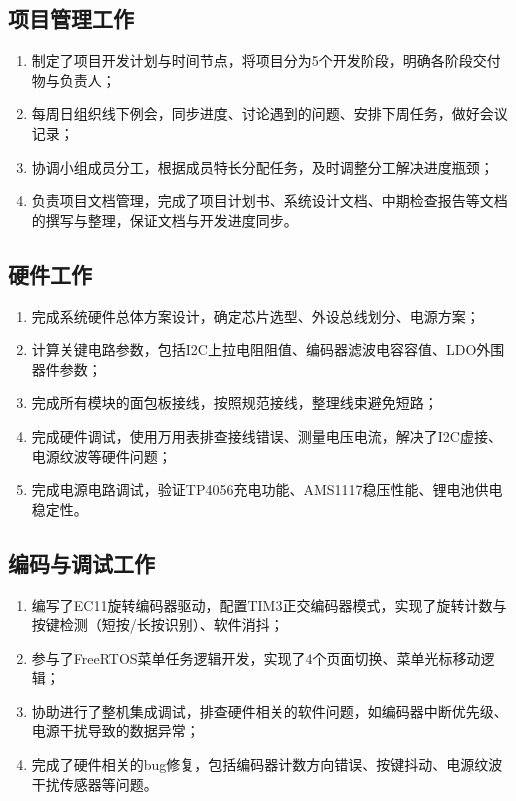 \documentclass[12pt, a4paper]{ctexart}
\begin{document}
\subsection{项目管理工作}
\begin{enumerate}
    \item 制定了项目开发计划与时间节点，将项目分为5个开发阶段，明确各阶段交付物与负责人；
    \item 每周日组织线下例会，同步进度、讨论遇到的问题、安排下周任务，做好会议记录；
    \item 协调小组成员分工，根据成员特长分配任务，及时调整分工解决进度瓶颈；
    \item 负责项目文档管理，完成了项目计划书、系统设计文档、中期检查报告等文档的撰写与整理，保证文档与开发进度同步。
\end{enumerate}

\subsection{硬件工作}
\begin{enumerate}
    \item 完成系统硬件总体方案设计，确定芯片选型、外设总线划分、电源方案；
    \item 计算关键电路参数，包括I2C上拉电阻阻值、编码器滤波电容容值、LDO外围器件参数；
    \item 完成所有模块的面包板接线，按照规范接线，整理线束避免短路；
    \item 完成硬件调试，使用万用表排查接线错误、测量电压电流，解决了I2C虚接、电源纹波等硬件问题；
    \item 完成电源电路调试，验证TP4056充电功能、AMS1117稳压性能、锂电池供电稳定性。
\end{enumerate}

\subsection{编码与调试工作}
\begin{enumerate}
    \item 编写了EC11旋转编码器驱动，配置TIM3正交编码器模式，实现了旋转计数与按键检测（短按/长按识别）、软件消抖；
    \item 参与了FreeRTOS菜单任务逻辑开发，实现了4个页面切换、菜单光标移动逻辑；
    \item 协助进行了整机集成调试，排查硬件相关的软件问题，如编码器中断优先级、电源干扰导致的数据异常；
    \item 完成了硬件相关的bug修复，包括编码器计数方向错误、按键抖动、电源纹波干扰传感器等问题。
\end{enumerate}
\end{document}
